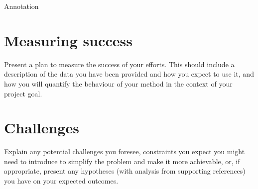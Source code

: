 \documentclass[10pt,twocolumn,letterpaper]{article}
\begin{document}
Annotation

\section{Measuring success}

Present a plan to measure the success of your efforts. This should include a description of the data you have been provided and how you expect to use it, and how you will quantify the behaviour of your method in the context of your project goal.

\section{Challenges}

Explain any potential challenges you foresee, constraints you expect you might need to introduce to simplify the problem and make it more achievable, or, if appropriate, present any hypotheses (with analysis from supporting references) you have on your expected outcomes.

{\small


}
\end{document}
